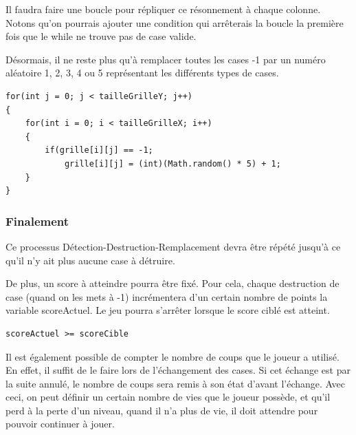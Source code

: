 	Il faudra faire une boucle pour répliquer ce résonnement à chaque colonne. Notons qu'on pourrais ajouter une condition qui arrêterais la boucle la première fois que le while ne trouve pas de case valide.
	
	Désormais, il ne reste plus qu'à remplacer toutes les cases -1 par un numéro aléatoire 1, 2, 3, 4 ou 5 représentant les différents types de cases.

\begin{lstlisting}
for(int j = 0; j < tailleGrilleY; j++)
{
	for(int i = 0; i < tailleGrilleX; i++)
	{
		if(grille[i][j] == -1;
			grille[i][j] = (int)(Math.random() * 5) + 1;
	}
}
\end{lstlisting}

\subsubsection{Finalement}

Ce processus Détection-Destruction-Remplacement devra être répété jusqu'à ce qu'il n'y ait plus aucune case à détruire.

De plus, un score à atteindre pourra être fixé. Pour cela, chaque destruction de case (quand on les mets à -1) incrémentera d'un certain nombre de points la variable scoreActuel. Le jeu pourra s'arrêter lorsque le score ciblé est atteint.
\begin{lstlisting}
scoreActuel >= scoreCible
\end{lstlisting}

Il est également possible de compter le nombre de coups que le joueur a utilisé. En effet, il suffit de le faire lors de l'échangement des cases. Si cet échange est par la suite annulé, le nombre de coups sera remis à son état d'avant l'échange.
Avec ceci, on peut définir un certain nombre de vies que le joueur possède, et qu'il perd à la perte d'un niveau, quand il n'a plus de vie, il doit attendre pour pouvoir continuer à jouer.